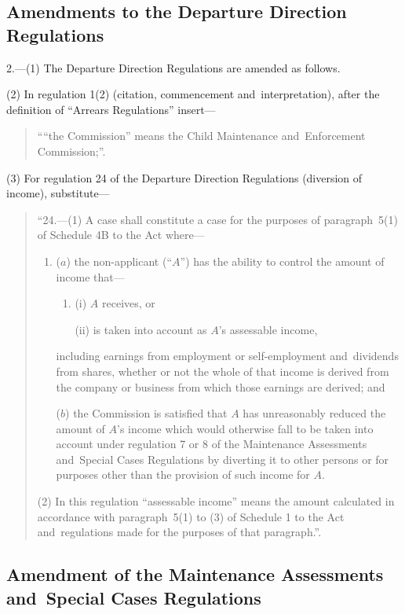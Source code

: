 \documentclass[12pt,a4paper]{article}
\begin{document}
\subsection[2. Amendments to the Departure Direction Regulations]{Amendments to the Departure Direction Regulations}

2.---(1)  The Departure Direction Regulations are amended as follows.

(2) In regulation 1(2) (citation, commencement and~interpretation), after the definition of “Arrears Regulations” insert—
\begin{quotation}
““the Commission” means the Child Maintenance and~Enforcement Commission;”.
\end{quotation}

(3) For regulation 24 of the Departure Direction Regulations (diversion of income), substitute—
\begin{quotation}
“24.---(1)  A case shall constitute a case for the purposes of paragraph~5(1) of Schedule 4B to the Act where—
\begin{enumerate}\item[]
($a$) the non-applicant (“$A$”) has the ability to control the amount of income that—
\begin{enumerate}\item[]
(i) $A$ receives, or

(ii) is taken into account as $A$’s assessable income,
\end{enumerate}
including earnings from employment or self-employment and~dividends from shares, whether or not the whole of that income is derived from the company or business from which those earnings are derived; and

($b$) the Commission is satisfied that $A$ has unreasonably reduced the amount of $A$’s income which would otherwise fall to be taken into account under regulation 7 or 8 of the Maintenance Assessments and~Special Cases Regulations by diverting it to other persons or for purposes other than the provision of such income for $A$.
\end{enumerate}

(2) In this regulation “assessable income” means the amount calculated in accordance with paragraph~5(1) to (3) of Schedule 1 to the Act and~regulations made for the purposes of that paragraph.”.
\end{quotation}

\subsection[3. Amendment of the Maintenance Assessments and~Special Cases Regulations]{Amendment of the Maintenance Assessments and~Special Cases Regulations}
\end{document}
